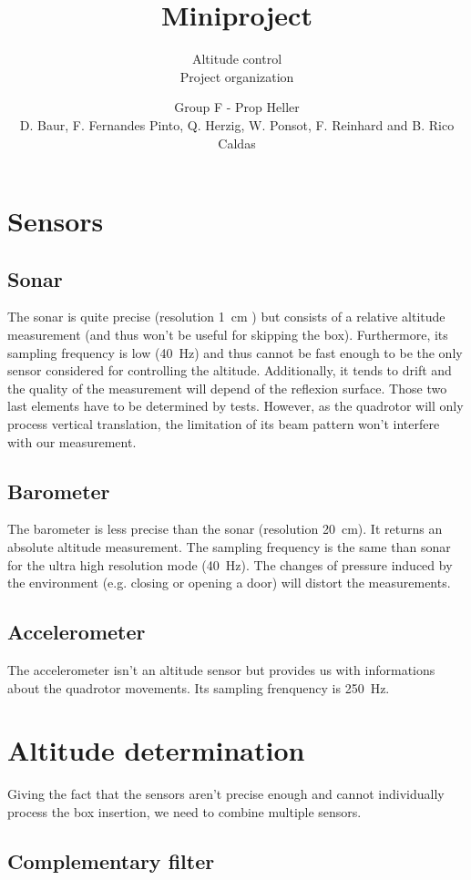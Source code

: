 \documentclass{repMobRob}
\author{Group F - Prop Heller \\ D. Baur, F. Fernandes Pinto, Q. Herzig, W. Ponsot, F. Reinhard and B. Rico Caldas}
\title{Miniproject}
\subtitle{Altitude control \\ \small{Project organization}}
\begin{document}
\thispagestyle{empty}
\maketitle

\section{Sensors}
\subsection{Sonar}
The sonar is quite precise (resolution \SI{1}{\centi\meter} ) but consists of a relative altitude measurement (and thus won’t be useful for skipping the box). Furthermore, its sampling frequency is low (\SI{40}{\hertz}) and thus cannot be fast enough to be the only sensor considered for controlling the altitude. Additionally, it tends to drift and the quality of the measurement will depend of the reflexion surface. Those two last elements have to be determined by tests. However, as the quadrotor will only process vertical translation, the limitation of its beam pattern won’t interfere with our measurement.

\subsection{Barometer}
The barometer is less precise than the sonar (resolution \SI{20}{\centi\meter}). It returns an absolute altitude measurement. The sampling frequency is the same than sonar for the ultra high resolution mode (\SI{40}{\hertz}). The changes of pressure induced by the environment (e.g. closing or opening a door) will distort the measurements.

\subsection{Accelerometer}
The accelerometer isn't an altitude sensor but provides us with informations about the quadrotor movements. Its sampling frenquency is \SI{250}{\hertz}. 

\section{Altitude determination}
Giving the fact that the sensors aren’t precise enough and cannot individually process the box insertion, we need to combine multiple sensors. 

\subsection{Complementary filter}
\end{document}

